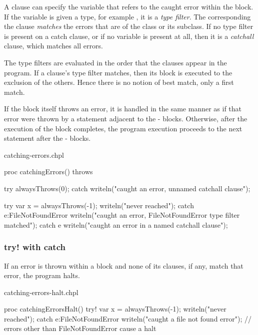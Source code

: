 A  clause can specify the variable that refers to the caught
error within the  block. If the variable is given a type,
for example , it is a \emph{type filter}.
The corresponding the  clause \emph{matches} the errors
that are of the class  or its subclass. If no type
filter is present on a catch clause, or if no variable is present at
all, then it is a \emph{catchall} clause, which matches all errors.

The type filters are evaluated in the order that the  clauses
appear in the program. If a  clause's type filter matches,
then its block is executed to the exclusion of the others. Hence there
is no notion of best match, only a first match.

If the  block itself throws an error, it is handled in the
same manner as if that error were thrown by a statement adjacent to the
- blocks. Otherwise, after the execution of the
 block completes, the program execution proceeds to the
next statement after the - blocks.

\begin{chapelexample}{catching-errors.chpl}
\begin{chapel}
proc catchingErrors() throws {
  try {
    alwaysThrows(0);
  } catch {
    writeln("caught an error, unnamed catchall clause");
  }

  try {
    var x = alwaysThrows(-1);
    writeln("never reached");
  } catch e:FileNotFoundError {
    writeln("caught an error, FileNotFoundError type filter matched");
  } catch e {
    writeln("caught an error in a named catchall clause");
  }
}
\end{chapel}
\begin{chapelpost}
\end{chapelpost}
\begin{chapeloutput}
\end{chapeloutput}
\end{chapelexample}

\subsubsection{try! with catch}
\label{try_bang_with_catch}

If an error is thrown within a  block and none of its
 clauses, if any, match that error, the program halts.

\begin{chapelexample}{catching-errors-halt.chpl}
\begin{chapel}
proc catchingErrorsHalt() {
  try! {
    var x = alwaysThrows(-1);
    writeln("never reached");
  } catch e:FileNotFoundError {
    writeln("caught a file not found error");
  }
  // errors other than FileNotFoundError cause a halt
}
\end{chapel}
\begin{chapelpost}
\end{chapelpost}
\begin{chapeloutput}
\end{chapeloutput}
\end{chapelexample}

